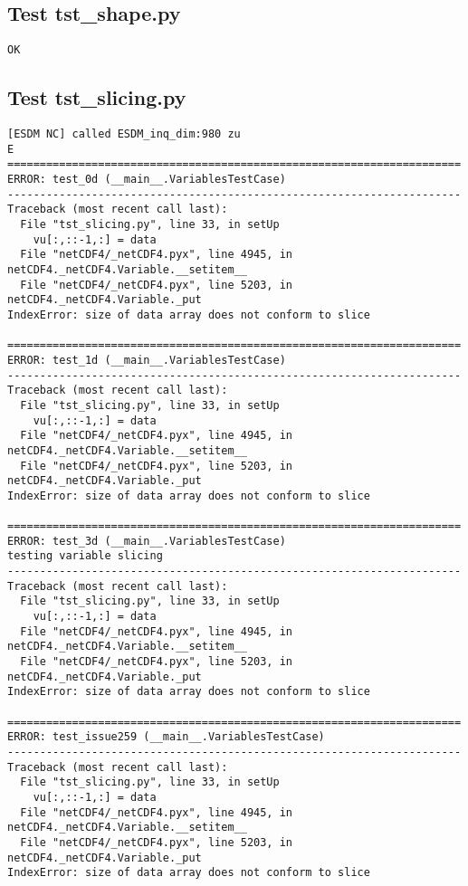 \subsection{Test tst\_shape.py}

\begin{verbatim}
OK
\end{verbatim}

\subsection{Test tst\_slicing.py}

\begin{verbatim}
[ESDM NC] called ESDM_inq_dim:980 zu
E
======================================================================
ERROR: test_0d (__main__.VariablesTestCase)
----------------------------------------------------------------------
Traceback (most recent call last):
  File "tst_slicing.py", line 33, in setUp
    vu[:,::-1,:] = data
  File "netCDF4/_netCDF4.pyx", line 4945, in netCDF4._netCDF4.Variable.__setitem__
  File "netCDF4/_netCDF4.pyx", line 5203, in netCDF4._netCDF4.Variable._put
IndexError: size of data array does not conform to slice

======================================================================
ERROR: test_1d (__main__.VariablesTestCase)
----------------------------------------------------------------------
Traceback (most recent call last):
  File "tst_slicing.py", line 33, in setUp
    vu[:,::-1,:] = data
  File "netCDF4/_netCDF4.pyx", line 4945, in netCDF4._netCDF4.Variable.__setitem__
  File "netCDF4/_netCDF4.pyx", line 5203, in netCDF4._netCDF4.Variable._put
IndexError: size of data array does not conform to slice

======================================================================
ERROR: test_3d (__main__.VariablesTestCase)
testing variable slicing
----------------------------------------------------------------------
Traceback (most recent call last):
  File "tst_slicing.py", line 33, in setUp
    vu[:,::-1,:] = data
  File "netCDF4/_netCDF4.pyx", line 4945, in netCDF4._netCDF4.Variable.__setitem__
  File "netCDF4/_netCDF4.pyx", line 5203, in netCDF4._netCDF4.Variable._put
IndexError: size of data array does not conform to slice

======================================================================
ERROR: test_issue259 (__main__.VariablesTestCase)
----------------------------------------------------------------------
Traceback (most recent call last):
  File "tst_slicing.py", line 33, in setUp
    vu[:,::-1,:] = data
  File "netCDF4/_netCDF4.pyx", line 4945, in netCDF4._netCDF4.Variable.__setitem__
  File "netCDF4/_netCDF4.pyx", line 5203, in netCDF4._netCDF4.Variable._put
IndexError: size of data array does not conform to slice


\end{verbatim}

